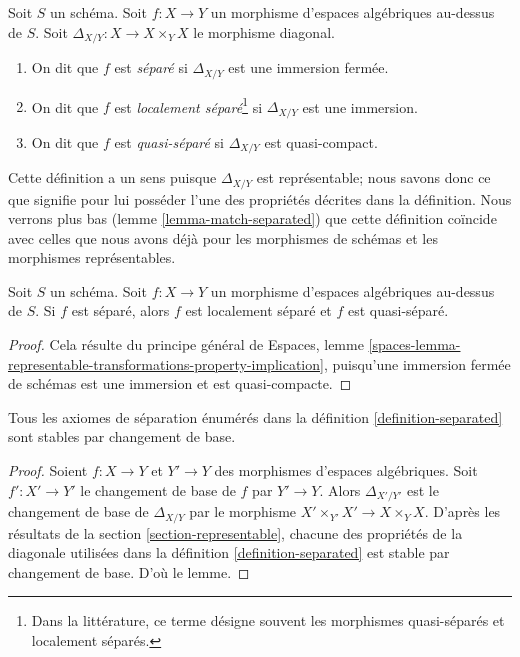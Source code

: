 \begin{definition}
\label{definition-separated}
Soit $S$ un schéma.
Soit $f : X \to Y$ un morphisme d'espaces algébriques au-dessus de $S$.
Soit $\Delta_{X/Y} : X \to X \times_Y X$ le morphisme diagonal.
\begin{enumerate}
\item On dit que $f$ est {\it séparé} si $\Delta_{X/Y}$ est une immersion fermée.
\item On dit que $f$ est {\it localement séparé}\footnote{Dans la littérature,
ce terme désigne souvent les morphismes quasi-séparés et localement séparés.}
si $\Delta_{X/Y}$ est une immersion.
\item On dit que $f$ est {\it quasi-séparé} si $\Delta_{X/Y}$ est quasi-compact.
\end{enumerate}
\end{definition}

\noindent
Cette définition a un sens puisque $\Delta_{X/Y}$ est représentable;
nous savons donc ce que signifie pour lui posséder l'une des propriétés
décrites dans la définition. Nous verrons plus bas
(lemme \ref{lemma-match-separated}) que cette définition coïncide avec celles
que nous avons déjà pour les morphismes de schémas et les morphismes représentables.

\begin{lemma}
\label{lemma-trivial-implications}
Soit $S$ un schéma. Soit $f : X \to Y$ un morphisme d'espaces algébriques
au-dessus de $S$. Si $f$ est séparé, alors $f$ est localement séparé et
$f$ est quasi-séparé.
\end{lemma}

\begin{proof}
Cela résulte du principe général de
Espaces,
lemme \ref{spaces-lemma-representable-transformations-property-implication},
puisqu'une immersion fermée de schémas est une immersion et est quasi-compacte.
\end{proof}

\begin{lemma}
\label{lemma-base-change-separated}
Tous les axiomes de séparation énumérés dans la définition \ref{definition-separated}
sont stables par changement de base.
\end{lemma}

\begin{proof}
Soient $f : X \to Y$ et $Y' \to Y$ des morphismes d'espaces algébriques.
Soit $f' : X' \to Y'$ le changement de base de $f$ par $Y' \to Y$. Alors
$\Delta_{X'/Y'}$ est le changement de base de $\Delta_{X/Y}$ par
le morphisme $X' \times_{Y'} X' \to X \times_Y X$. D'après les résultats de
la section \ref{section-representable},
chacune des propriétés de la diagonale utilisées dans la
définition \ref{definition-separated}
est stable par changement de base. D'où le lemme.
\end{proof}


